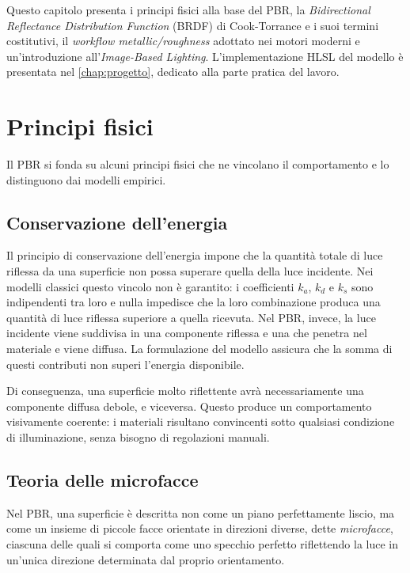 \documentclass[12pt,a4paper,twoside]{book}
\begin{document}
Questo capitolo presenta i principi fisici alla base del PBR, la \textit{Bidirectional Reflectance Distribution Function} (BRDF) di Cook-Torrance e i suoi termini costitutivi, il \textit{workflow metallic/roughness} adottato nei motori moderni e un'introduzione all'\textit{Image-Based Lighting}. L'implementazione HLSL del modello è presentata nel \cref{chap:progetto}, dedicato alla parte pratica del lavoro.

\section{Principi fisici}
\label{sec:principi-pbr}

Il PBR si fonda su alcuni principi fisici che ne vincolano il comportamento e lo distinguono dai modelli empirici.

\subsection{Conservazione dell'energia}
\label{subsec:conservazione}
Il principio di conservazione dell'energia impone che la quantità totale di luce riflessa da una superficie non possa superare quella della luce incidente. Nei modelli classici questo vincolo non è garantito: i coefficienti $k_a$, $k_d$ e $k_s$ sono indipendenti tra loro e nulla impedisce che la loro combinazione produca una quantità di luce riflessa superiore a quella ricevuta. Nel PBR, invece, la luce incidente viene suddivisa in una componente riflessa e una che penetra nel materiale e viene diffusa. La formulazione del modello assicura che la somma di questi contributi non superi l'energia disponibile.

Di conseguenza, una superficie molto riflettente avrà necessariamente una componente diffusa debole, e viceversa. Questo produce un comportamento visivamente coerente: i materiali risultano convincenti sotto qualsiasi condizione di illuminazione, senza bisogno di regolazioni manuali.

\subsection{Teoria delle microfacce}
\label{subsec:microfacce}

Nel PBR, una superficie è descritta non come un piano perfettamente liscio, ma come un insieme di piccole facce orientate in direzioni diverse, dette \textit{microfacce}, ciascuna delle quali si comporta come uno specchio perfetto riflettendo la luce in un'unica direzione determinata dal proprio orientamento.
\end{document}
